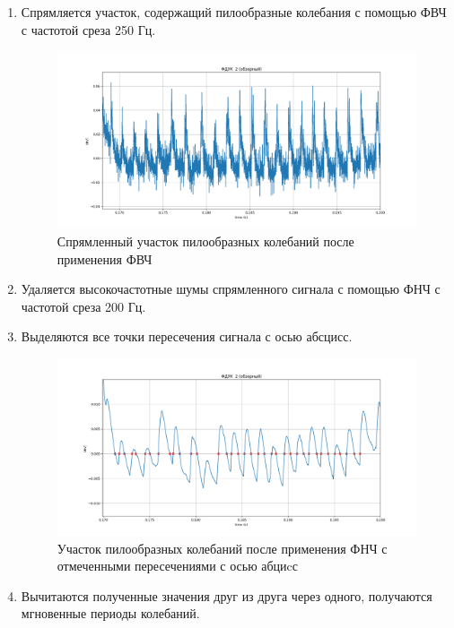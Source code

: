 \documentclass[12pt,a4paper]{article}
\begin{document}
		\begin{enumerate}
			\item Спрямляется участок, содержащий пилообразные колебания с помощью ФВЧ с частотой среза
			250 Гц.
			
			\FloatBarrier
			\begin{figure}[h!]
				\centering\includegraphics[width=1\linewidth]{./../plots/freq_hp_filtered.png}
				\caption{Спрямленный участок пилообразных колебаний после применения ФВЧ}
			\end{figure}
			\FloatBarrier
			
			\item Удаляется высокочастотные шумы спрямленного сигнала с помощью ФНЧ с частотой среза 200
			Гц.
		
			\item Выделяются все точки пересечения сигнала с осью абсцисс.
			\FloatBarrier
			\begin{figure}[h!]
				\centering\includegraphics[width=1\linewidth]{./../plots/freq_lp_filtered.png}
				\caption{Участок пилообразных колебаний после применения ФНЧ с отмеченными пересечениями с осью абциcс}
			\end{figure}
			\FloatBarrier
			
			\item Вычитаются полученные значения друг из друга через одного, получаются мгновенные периоды
			колебаний.
			

\end{enumerate}
\end{document}
